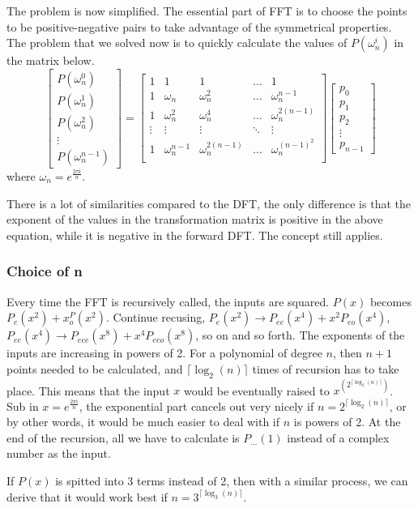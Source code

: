 The problem is now simplified. The essential part of FFT is to choose the points to be positive-negative pairs to 
take advantage of the symmetrical properties. The problem that we solved now is to quickly calculate the values of 
$P(\omega_n^i)$ in the matrix below. 
$$
\begin{bmatrix}
    P(\omega_n^0) \\  P(\omega_n^1) \\ P(\omega_n^2)  \\  \vdots \\   P(\omega_n^{n-1})
\end{bmatrix}
=
\begin{bmatrix}
    1   &   1               &   1                   &   \dots   &   1                       \\
    1   &   \omega_n        &   \omega_n^2          &   \dots   &   \omega_n^{n-1}          \\
    1   &   \omega_n^2      &   \omega_n^4          &   \dots   &   \omega_n^{2(n-1)}       \\
    \vdots & \vdots         &   \vdots              &   \ddots  &   \vdots                  \\
    1   &   \omega_n^{n-1}  &   \omega_n^{2(n-1)}   &   \dots   &   \omega_n^{(n-1)^2}      \\
\end{bmatrix}
\begin{bmatrix}
    p_0 \\  p_1 \\ p_2  \\  \vdots \\   p_{n-1}
\end{bmatrix}
$$
where $\omega_n = e^{\frac{2\pi\mathrm{i}}{n}}$.

There is a lot of similarities compared to the DFT, the only difference is that 
the exponent of the values in the transformation matrix is positive in the above equation, while it is negative in 
the forward DFT. The concept still applies.


\subsubsection{Choice of n}
Every time the FFT is recursively called, the inputs are squared. $P(x)$ becomes $P_e(x^2)+x^P_o(x^2)$. 
Continue recusing, $P_e(x^2)\rightarrow P_{ee}(x^4)+x^2P_{eo}(x^4)$, 
$P_{ee}(x^4)\rightarrow P_{eee}(x^8)+x^4P_{eeo}(x^8)$, 
so on and so forth. The exponents of the inputs are increasing in powers of 2. For a polynomial of degree $n$, 
then $n+1$ points needed to be calculated, and $\lceil\log_{2}(n)\rceil$ times of recursion has to take place. 
This means that the input $x$ would be eventually raised to $x^{(2^{\lceil\log_{2}(n)\rceil})}$. 
Sub in $x=e^{\frac{2\pi\mathrm{i}}{n}}$, 
the exponential part cancels out very nicely if $n=2^{\lceil\log_{2}(n)\rceil}$, or by other words, 
it would be much easier to deal with if $n$ is powers of 2. 
At the end of the recursion, all we have to calculate is $P_{\dots}(1)$ instead of a complex number as the input.

If $P(x)$ is spitted into 3 terms instead of 2, then with a similar process, we can derive that it would work best 
if $n=3^{\lceil\log_{3}(n)\rceil}$. 

